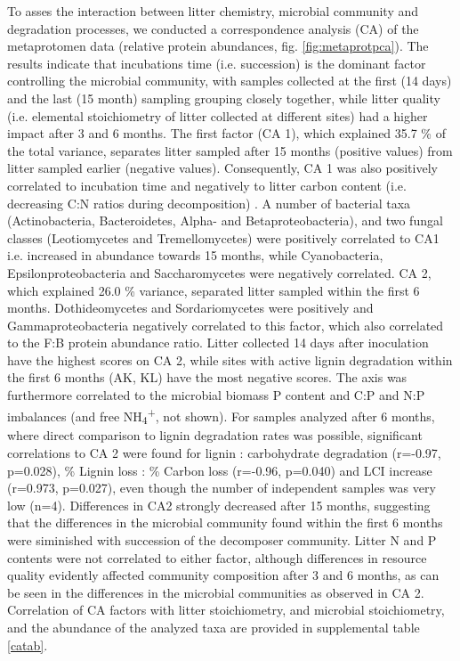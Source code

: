 To asses the interaction between litter chemistry, microbial community and degradation processes, we conducted a correspondence analysis (CA) of the metaprotomen data (relative protein abundances, fig. \ref{fig:metaprotpca}). The results indicate that incubations time (i.e. succession) is the dominant factor controlling the microbial community, with samples collected at the first (14 days) and the last (15 month) sampling grouping closely together, while litter quality (i.e. elemental stoichiometry of litter collected at different sites) had a higher impact after 3 and 6 months. The first factor (CA 1), which explained 35.7 \% of the total variance, separates litter sampled after 15 months (positive values) from litter sampled earlier (negative values). Consequently, CA 1 was also positively correlated to incubation time and negatively to litter carbon content (i.e. decreasing C:N ratios during decomposition) . A number of bacterial taxa (Actinobacteria, Bacteroidetes, Alpha- and Betaproteobacteria), and two fungal classes (Leotiomycetes and Tremellomycetes) were positively correlated to CA1 i.e. increased in abundance towards 15 months, while Cyanobacteria, Epsilonproteobacteria and Saccharomycetes were negatively correlated. CA 2, which explained 26.0 \% variance, separated litter sampled within the first 6 months. Dothideomycetes and Sordariomycetes were positively and Gammaproteobacteria negatively correlated to this factor, which also correlated to the F:B protein abundance ratio. Litter collected 14 days after inoculation have the highest scores on CA 2, while sites with active lignin degradation within the first 6 months (AK, KL) have the most negative scores. The axis was furthermore correlated to the microbial biomass P content and C:P and N:P imbalances (and free NH\textsubscript{4}\textsuperscript{+}, not shown). For samples analyzed after 6 months, where direct comparison to lignin degradation rates was possible, significant correlations to CA 2 were found for lignin : carbohydrate degradation (r=-0.97, p=0.028), \% Lignin loss : \% Carbon loss (r=-0.96, p=0.040) and  LCI increase (r=0.973, p=0.027), even though the number of independent samples was very low (n=4). Differences in CA2 strongly decreased after 15 months, suggesting that the differences in the microbial community found within the first 6 months were siminished with succession of the decomposer community. Litter N and P contents were not correlated to either factor, although differences in resource quality evidently affected community composition after 3 and 6 months, as can be seen in the differences in the microbial communities as observed in CA 2. Correlation of CA factors with litter stoichiometry, and microbial stoichiometry, and the abundance of the analyzed taxa are provided in supplemental table \ref{catab}.